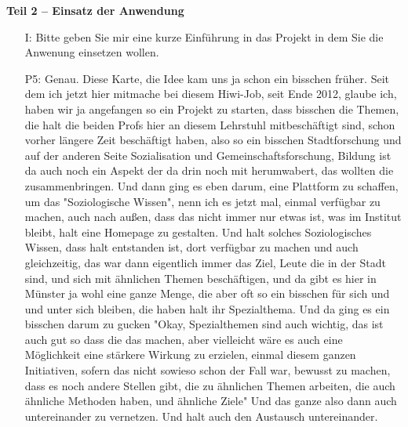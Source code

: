 \textbf{Teil 2 -- Einsatz der Anwendung}
\begin{itemize}
    \item[I:] Bitte geben Sie mir eine kurze Einf{\"u}hrung in das Projekt in dem Sie die Anwenung einsetzen wollen.
    \item[P5:] Genau. Diese Karte, die Idee kam uns ja schon ein bisschen fr{\"u}her. Seit dem ich jetzt hier mitmache bei diesem Hiwi-Job, seit Ende 2012, glaube ich, haben wir ja angefangen so ein Projekt zu starten, dass bisschen die Themen, die halt die beiden Profs hier an diesem Lehrstuhl mitbesch{\"a}ftigt sind, schon vorher l{\"a}ngere Zeit besch{\"a}ftigt haben, also so ein bisschen Stadtforschung und auf der anderen Seite Sozialisation und Gemeinschaftsforschung, Bildung ist da auch noch ein Aspekt der da drin noch mit herumwabert, das wollten die zusammenbringen. Und dann ging es eben darum, eine Plattform zu schaffen, um das "Soziologische Wissen", nenn ich es jetzt mal, einmal verf{\"u}gbar zu machen, auch nach au{\ss}en, dass das nicht immer nur etwas ist, was im Institut bleibt, halt eine Homepage zu gestalten. Und halt solches Soziologisches Wissen, dass halt entstanden ist, dort verf{\"u}gbar zu machen und auch gleichzeitig, das war dann eigentlich immer das Ziel, Leute die in der Stadt sind, und sich mit {\"a}hnlichen Themen besch{\"a}ftigen, und da gibt es hier in M{\"u}nster ja wohl eine ganze Menge, die aber oft so ein bisschen f{\"u}r sich und und unter sich bleiben, die haben halt ihr Spezialthema. Und da ging es ein bisschen darum zu gucken "Okay, Spezialthemen sind auch wichtig, das ist auch gut so dass die das machen, aber vielleicht w{\"a}re es auch eine M{\"o}glichkeit eine st{\"a}rkere Wirkung zu erzielen, einmal diesem ganzen Initiativen, sofern das nicht sowieso schon der Fall war, bewusst zu machen, dass es noch andere Stellen gibt, die zu {\"a}hnlichen Themen arbeiten, die auch {\"a}hnliche Methoden haben, und {\"a}hnliche Ziele" Und das ganze also dann auch untereinander zu vernetzen. Und halt auch den Austausch untereinander.\\

\end{itemize}
